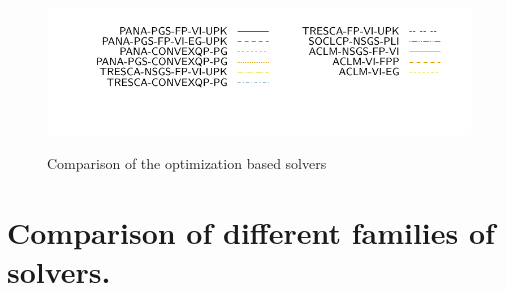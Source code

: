 \begin{figure}
{\includegraphics[height=\legendheight]{../figure/OPTI/1.0e-08/50/time/profile-Chain_legend.pdf}}
 \caption{Comparison of the optimization based solvers}
  \label{fig:OPTI}
\end{figure}



\section{Comparison of different families of solvers.}
\label{Sec:Comparison}

